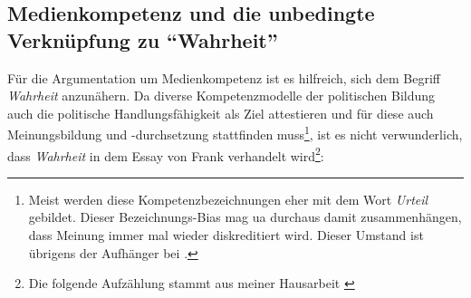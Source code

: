 

\subsection{Medienkompetenz und die unbedingte Verknüpfung zu \enquote{Wahrheit} \label{media}} 
Für die Argumentation um Medienkompetenz ist es hilfreich, sich dem Begriff \emph{Wahrheit} anzunähern. 
Da diverse Kompetenzmodelle der politischen Bildung auch die politische Handlungsfähigkeit als Ziel attestieren und für diese auch Meinungsbildung und -durchsetzung stattfinden muss\footnote{
    Meist werden diese Kompetenzbezeichnungen eher mit dem Wort \emph{Urteil} gebildet. Dieser Bezeichnungs-Bias mag \gls{ua} durchaus damit zusammenhängen, dass Meinung immer mal wieder diskreditiert wird. Dieser Umstand ist übrigens der Aufhänger bei \textcite[]{Nullmeier2019}.

}, ist es nicht verwunderlich, dass \emph{Wahrheit} in dem Essay  von Frank \textcite[]{Nullmeier2019} verhandelt wird\footnote{Die folgende Aufzählung stammt aus meiner Hausarbeit \autocite[4]{Klein2022}}:

